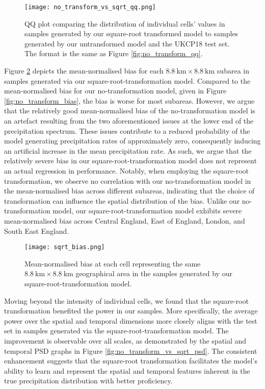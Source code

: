 \documentclass[ oneside,%
                    author={George Herbert},
                    degree={MSci},
                     title={Diffusion Models for Time-Evolving Precipitation Fields},
                  subtitle={}]{dissertation}
\begin{document}
\begin{figure}[htbp]
      \centering
      \texttt{[image: no\_transform\_vs\_sqrt\_qq.png]}
      \caption{QQ plot comparing the distribution of individual cells' values in samples generated by our square-root transformed model to samples generated by our untransformed model and the UKCP18 test set. The format is the same as Figure \ref{fig:no_transform_qq}.}
      \label{fig:no_transform_vs_sqrt_qq}
\end{figure}

Figure \ref{fig:sqrt_bias} depicts the mean-normalised bias for each $8.8\ \mathrm{km}\times 8.8\ \mathrm{km}$ subarea in samples generated via our square-root-transformation model. Compared to the mean-normalised bias for our no-transformation model, given in Figure \ref{fig:no_transform_bias}, the bias is worse for most subareas. However, we argue that the relatively good mean-normalised bias of the no-transformation model is an artefact resulting from the two aforementioned issues at the lower end of the precipitation spectrum. These issues contribute to a reduced probability of the model generating precipitation rates of approximately zero, consequently inducing an artificial increase in the mean precipitation rate. As such, we argue that the relatively severe bias in our square-root-transformation model does not represent an actual regression in performance. Notably, when employing the square-root transformation, we observe no correlation with our no-transformation model in the mean-normalised bias across different subareas, indicating that the choice of transformation can influence the spatial distribution of the bias. Unlike our no-transformation model, our square-root-transformation model exhibits severe mean-normalised bias across Central England, East of England, London, and South East England.

\begin{figure}[htbp]
      \centering
      \texttt{[image: sqrt\_bias.png]}
      \caption{Mean-normalised bias at each cell representing the same $8.8\ \mathrm{km}\times 8.8\ \mathrm{km}$ geographical area in the samples generated by our square-root-transformation model.}
      \label{fig:sqrt_bias}
\end{figure}

Moving beyond the intensity of individual cells, we found that the square-root transformation benefited the power in our samples. More specifically, the average power over the spatial and temporal dimensions more closely aligns with the test set in samples generated via the square-root-transformation model. The improvement is observable over all scales, as demonstrated by the spatial and temporal PSD graphs in Figure \ref{fig:no_transform_vs_sqrt_psd}. The consistent enhancement suggests that the square-root transformation facilitates the model's ability to learn and represent the spatial and temporal features inherent in the true precipitation distribution with better proficiency.
\end{document}
